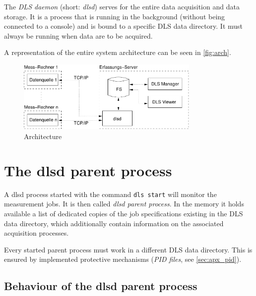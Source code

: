 \documentclass[a4paper,12pt,BCOR6mm,bibtotoc,idxtotoc]{scrbook}
\begin{document}
The \textit{DLS daemon} (short: \textit{dlsd}) serves for the entire data
acquisition and data storage. It is a process that is running in
the background (without being connected to a console) and is bound to a
specific DLS data directory. It must always be
running when data are to be acquired.

A representation of the entire system architecture can be
seen in \autoref{fig:arch}.

\begin{figure}[htb] \begin{center} \includegraphics[width=250pt]{bilder/arch} \end{center} \caption{Architecture} \label{fig:arch} \end{figure}


\section{The dlsd parent process}
\label{sec:dlsd_mother}

A dlsd process started with the command \texttt{dls start} will monitor the
measurement jobs. It is then called \textit{dlsd parent
process}. In the memory it holds available a list of dedicated copies of the
job specifications existing in the DLS data directory, which additionally
contain information on the associated acquisition processes.

Every started parent process must work in a different DLS data
directory. This is ensured by implemented protective
mechanisms (\textit{PID files}, see \autoref{sec:apx_pid}).


\subsection{Behaviour of the dlsd parent process}
\label{sec:dlsd_mother_behaviour}
\end{document}
